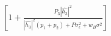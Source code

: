 \documentclass[preview]{standalone}
\begin{document}
\begin{align*}
\left[1 + \frac{P_3 \left|\hat{h_3}\right|^2}{\left|\hat{h_3}\right|^2 (p_1 + p_2) + P \sigma_{\epsilon}^2 + w_B \sigma^2}\right]
\end{align*}
\end{document}
